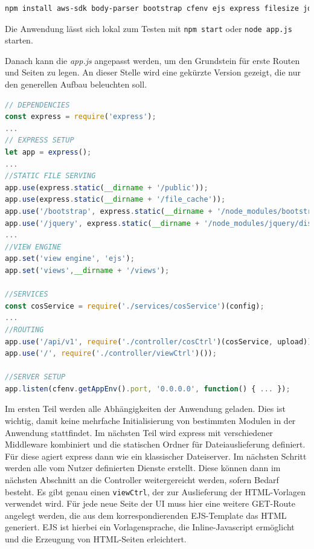 \begin{lstlisting}[language=bash, caption=Paket Installation und package.json erzeugung]
npm install aws-sdk body-parser bootstrap cfenv ejs express filesize jquery moment morgan multer promise toastr watson-developer-cloud --save
\end{lstlisting}

Die Anwendung lässt sich lokal zum Testen mit \lstinline|npm start| oder \lstinline|node app.js| starten.
 
Danach kann die \textit{app.js} angepasst werden, um den Grundstein für erste Routen und Seiten zu legen. An dieser Stelle wird eine gekürzte Version gezeigt, die nur den generellen Aufbau beleuchten soll.

\begin{lstlisting}[language=JavaScript, caption=Anpassung der Hauptdatei der Anwendung]
// DEPENDENCIES
const express = require('express');
... 
// EXPRESS SETUP
let app = express();
...
//STATIC FILE SERVING
app.use(express.static(__dirname + '/public'));
app.use(express.static(__dirname + '/file_cache'));
app.use('/bootstrap', express.static(__dirname + '/node_modules/bootstrap/dist'));
app.use('/jquery', express.static(__dirname + '/node_modules/jquery/dist'));
...
//VIEW ENGINE
app.set('view engine', 'ejs');
app.set('views',__dirname + '/views');

//SERVICES
const cosService = require('./services/cosService')(config);
...
//ROUTING
app.use('/api/v1', require('./controller/cosCtrl')(cosService, upload));
app.use('/', require('./controller/viewCtrl')());

//SERVER SETUP
app.listen(cfenv.getAppEnv().port, '0.0.0.0', function() { ... });
\end{lstlisting}

Im ersten Teil werden alle Abhängigkeiten der Anwendung geladen. Dies ist wichtig, damit keine mehrfache Initialisierung von bestimmten Modulen in der Anwendung stattfindet. Im nächsten Teil wird express mit verschiedener Middleware kombiniert und die statischen Ordner für Dateiauslieferung definiert. Für diese agiert express dann wie ein klassischer Dateiserver.
Im nächsten Schritt werden alle vom Nutzer definierten Dienste erstellt. Diese können dann im nächsten Abschnitt an die Controller weitergereicht werden, sofern Bedarf besteht.
Es gibt genau einen \lstinline|viewCtrl|, der zur Auslieferung der HTML-Vorlagen verwendet wird. Für jede neue Seite der \ac{UI} muss hier eine weitere GET-Route angelegt werden, die aus dem korrespondierenden EJS-Template das HTML generiert.
EJS ist hierbei ein Vorlagensprache, die Inline-Javascript ermöglicht und die Erzeugung von HTML-Seiten erleichtert.

